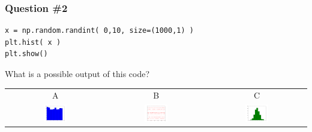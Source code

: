 \documentclass[11pt]{beamer}
\begin{document}
\begin{frame}[fragile]
  \frametitle{Question \#2}
  \Enlarge

  \begin{Verbatim}
x = np.random.randint( 0,10, size=(1000,1) )
plt.hist( x )
plt.show()
  \end{Verbatim}

  What is a possible output of this code?

  \begin{center}
  \begin{tabular}{ccc}
    A & B & C \\
    \includegraphics[width=0.25\textwidth]{./img/figure_1.png}
    &
    \includegraphics[width=0.25\textwidth]{./img/figure_2.png}
    &
    \includegraphics[width=0.25\textwidth]{./img/figure_3.png}
  \end{tabular}
  \end{center}
\end{frame}
\end{document}
